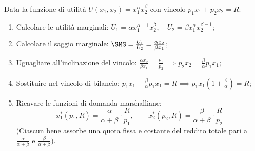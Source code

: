 \begin{metodo}
Data la funzione di utilità $U(x_1, x_2) = x_1^\alpha x_2^\beta$ con vincolo $p_1 x_1 + p_2 x_2 = R$:
\begin{enumerate}
    \item Calcolare le utilità marginali: $U_1 = \alpha x_1^{\alpha-1} x_2^\beta, \quad U_2 = \beta x_1^\alpha x_2^{\beta-1}$;
    \item Calcolare il saggio marginale: $\SMS = \frac{U_1}{U_2} = \frac{\alpha x_2}{\beta x_1}$;
    \item Uguagliare all'inclinazione del vincolo: $\frac{\alpha x_2}{\beta x_1} = \frac{p_1}{p_2} \implies p_2 x_2 = \frac{\beta}{\alpha} p_1 x_1$;
    \item Sostituire nel vincolo di bilancio: $p_1 x_1 + \frac{\beta}{\alpha} p_1 x_1 = R \implies p_1 x_1 \left(1 + \frac{\beta}{\alpha}\right) = R$;
    \item Ricavare le funzioni di domanda marshalliane:
    \begin{equation}
        x_1^*(p_1, R) = \frac{\alpha}{\alpha + \beta} \cdot \frac{R}{p_1}, \qquad x_2^*(p_2, R) = \frac{\beta}{\alpha + \beta} \cdot \frac{R}{p_2}
    \end{equation}
    (Ciascun bene assorbe una quota fissa e costante del reddito totale pari a $\frac{\alpha}{\alpha+\beta}$ e $\frac{\beta}{\alpha+\beta}$).
\end{enumerate}
\end{metodo}

